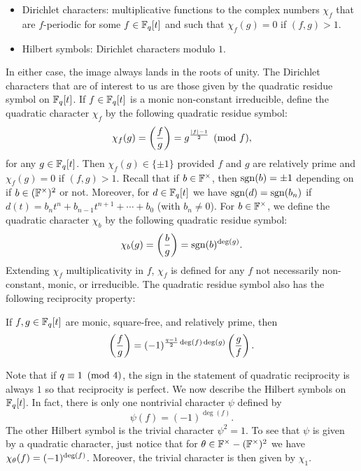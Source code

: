 \documentclass[12pt,reqno,oneside]{amsart}
\begin{document}
        \begin{itemize}
            \item Dirichlet characters: multiplicative functions to the complex numbers $\chi_{f}$ that are $f$-periodic for some $f \in \mathbb{F}_{q}[t]$ and such that $\chi_{f}(g) = 0$ if $(f,g) > 1$.
            \item Hilbert symbols: Dirichlet characters modulo $1$.
        \end{itemize}
        
        In either case, the image always lands in the roots of unity. The Dirichlet characters that are of interest to us are those given by the quadratic residue symbol on $\mathbb{F}_{q}[t]$. If $f \in \mathbb{F}_{q}[t]$ is a monic non-constant irreducible, define the quadratic character $\chi_{f}$ by the following quadratic residue symbol:
        \[
            \chi_{f}(g) = \left(\frac{f}{g}\right) = g^{\frac{|f|-1}{2}} \pmod{f},
        \]
        for any $g \in \mathbb{F}_{q}[t]$. Then $\chi_{f}(g) \in \{\pm 1\}$ provided $f$ and $g$ are relatively prime and $\chi_{f}(g) = 0$ if $(f,g) > 1$. Recall that if $b \in \mathbb{F}^{\times}$, then $\operatorname{\mathrm{sgn}}(b) = \pm1$ depending on if $b \in (\mathbb{F}^{\times})^{2}$ or not. Moreover, for $d \in \mathbb{F}_{q}[t]$ we have $\operatorname{\mathrm{sgn}}(d) = \operatorname{\mathrm{sgn}}(b_{n})$ if $d(t) = b_{n}t^{n}+b_{n-1}t^{n+1}+\cdots+b_{0}$ (with $b_{n} \neq 0$). For $b \in \mathbb{F}^{\times}$, we define the quadratic character $\chi_{b}$ by the following quadratic residue symbol:
        \[
            \chi_{b}(g) = \left(\frac{b}{g}\right) = \operatorname{\mathrm{sgn}}(b)^{\deg(g)}.
        \]
        Extending $\chi_{f}$ multiplicativity in $f$, $\chi_{f}$ is defined for any $f$ not necessarily non-constant, monic, or irreducible. The quadratic residue symbol also has the following reciprocity property:

        \begin{theorem}
            If $f,g \in \mathbb{F}_{q}[t]$ are monic, square-free, and relatively prime, then
            \[
                \left(\frac{f}{g}\right) = (-1)^{\frac{q-1}{2}\deg(f)\deg(g)}\left(\frac{g}{f}\right).
            \]
        \end{theorem}

        Note that if $q \equiv 1 \ \left(\text{mod }4\right)$, the sign in the statement of quadratic reciprocity is always $1$ so that reciprocity is perfect. We now describe the Hilbert symbols on $\mathbb{F}_{q}[t]$. In fact, there is only one nontrivial character $\psi$ defined by
        \[
            \psi(f) = (-1)^{\deg(f)}.
        \]
        The other Hilbert symbol is the trivial character $\psi^{2} = 1$. To see that $\psi$ is given by a quadratic character, just notice that for $\theta \in \mathbb{F}^{\times}-(\mathbb{F}^{\times})^{2}$ we have $\chi_{\theta}(f) = (-1)^{\deg(f)}$. Moreover, the trivial character is then given by $\chi_{1}$.
\end{document}
